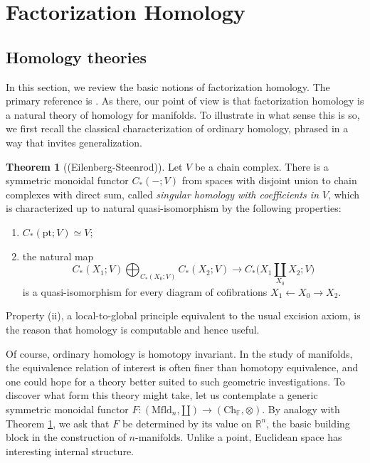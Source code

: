 \documentclass{compositio}
\theoremstyle{definition}\newtheorem{definition}{Definition}[section]
\theoremstyle{theorem}\newtheorem{lemma}[definition]{Lemma}
\theoremstyle{remark}\newtheorem*{conventions}{Conventions}
\theoremstyle{remark}\newtheorem*{acknowledgments}{Acknowledgments}
\theoremstyle{remark}\newtheorem*{outline}{Outline}
\theoremstyle{remark}\newtheorem*{questions}{Questions}
\theoremstyle{remark}\newtheorem{example}[definition]{Example}
\theoremstyle{definition}\newtheorem{construction}[definition]{Construction}
\theoremstyle{definition}\newtheorem*{convention}{Convention}
\theoremstyle{definition}\newtheorem*{conjecture}{Conjecture}
\theoremstyle{theorem}\newtheorem{theorem}[definition]{Theorem}
\theoremstyle{theorem}\newtheorem{paradigm}[definition]{Paradigm}
\theoremstyle{remark}\newtheorem{remark}[definition]{Remark}
\theoremstyle{corollary}\newtheorem{corollary}[definition]{Corollary}
\theoremstyle{theorem}\newtheorem{proposition}[definition]{Proposition}
\theoremstyle{definition}\newtheorem{question}[definition]{Question}
\begin{document}
\section{Factorization Homology}

\subsection{Homology theories}\label{factorization homology} In this section, we review the basic notions of factorization homology. The primary reference is \cite{Francis}. As there, our point of view is that factorization homology is a natural theory of homology for manifolds. To illustrate in what sense this is so, we first recall the classical characterization of ordinary homology, phrased in a way that invites generalization.

\begin{theorem}[(Eilenberg-Steenrod)]\label{Eilenberg-Steenrod}
Let $V$ be a chain complex. There is a symmetric monoidal functor $C_*(-; V)$ from spaces with disjoint union to chain complexes with direct sum, called \emph{singular homology with coefficients in $V$}, which is characterized up to natural quasi-isomorphism by the following properties:
\begin{enumerate}
\item $C_*(\mathrm{pt}; V)\simeq V$;
\item the natural map $$C_*(X_1;V)\bigoplus_{C_*(X_0;V)}C_*(X_2;V)\to C_*\bigg(X_1\coprod_{X_0} X_2;V\bigg)$$ is a quasi-isomorphism for every diagram of cofibrations $X_1\leftarrow X_0\rightarrow X_2$.
\end{enumerate}
\end{theorem}

Property (ii), a local-to-global principle equivalent to the usual excision axiom, is the reason that homology is computable and hence useful. 

Of course, ordinary homology is homotopy invariant. In the study of manifolds, the equivalence relation of interest is often finer than homotopy equivalence, and one could hope for a theory better suited to such geometric investigations. To discover what form this theory might take, let us contemplate a generic symmetric monoidal functor $F:({\mathrm{Mfld}}_n,\amalg)\to ({\mathrm{Ch}}_\mathbb{F},\otimes)$. By analogy with Theorem \ref{Eilenberg-Steenrod}, we ask that $F$ be determined by its value on $\mathbb{R}^n$, the basic building block in the construction of $n$-manifolds. Unlike a point, Euclidean space has interesting internal structure.
\end{document}
